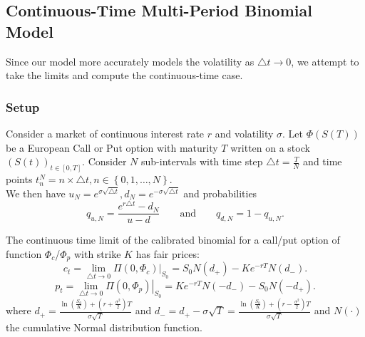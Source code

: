 \subsection{Continuous-Time Multi-Period Binomial Model}
Since our model more accurately models the volatility as $\triangle t\to 0$, we
attempt to take the limits and compute the continuous-time case. 
\subsubsection{Setup}
Consider a market of continuous interest rate $r$ and volatility $\sigma$. Let
$\Phi\left( S(T) \right) $be a European Call or Put option with maturity $T$
written on a stock ${\left( S(t) \right) }_{t\in \left[ 0,T \right]}$. Consider $N$ sub-intervals
with time step $\triangle t=\frac{T}{N}$ and time points $t_{n}^{N}=n\times
\triangle t, n\in \left\{ 0,1,\ldots,N \right\}$.\\
We then have $u_N=e^{\sigma \sqrt{\triangle t}}, d_N=e^{-\sigma \sqrt{\triangle
t}}$ and probabilities
\[q_{u,N}=\frac{e^{r\triangle t}-d_N}{u-d}\qquad\text{and}\qquad q_{d,N}=1-q_{u,N}.\]
\begin{theorem}
  The continuous time limit of the calibrated binomial for a call/put option of
  function $\Phi_c$/$\Phi_p$ with strike $K$ has fair prices:
  \[c_t=\lim_{\triangle t \to 0} \left.\Pi\left( 0,\Phi_c \right)
    \right|_{S_0}=S_0N\left( d_+ \right)-Ke^{-rT}N(d_{-}).\] 
  \[p_t=\lim_{\triangle t \to 0} \left.\Pi\left( 0,\Phi_p \right)
    \right|_{S_0}=Ke^{-rT}N(-d_{-})-S_0N\left( -d_+ \right).\] 
  where $d_+=\frac{\ln\left( \frac{S_0}{K}\right)+\left( r+\frac{\sigma^{2}}{2}
  \right) T  }{\sigma \sqrt{T}}$ and $d_-=d_+-\sigma \sqrt{T}=\frac{\ln\left(
  \frac{S_0}{K}\right)+\left( r-\frac{\sigma^{2}}{2} \right) T  }{\sigma
  \sqrt{T}}$ and $N(\cdot)$ the cumulative Normal distribution function.
\end{theorem}
